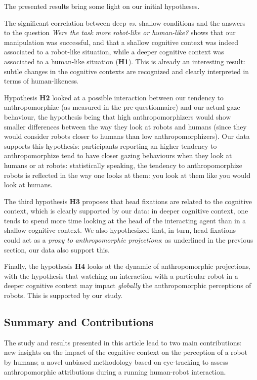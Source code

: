 \documentclass[lettersize, noapacite, twoside, HRI]{apa_HRI}
\newcommand{\vs}{\textit{vs.}\xspace}
\newcommand{\h}[1]{\textbf{H#1}\xspace}
\begin{document}
The presented results bring some light on our initial hypotheses.

The significant correlation between deep \vs shallow conditions and the
answers to the question \emph{Were the task more robot-like or human-like?}
shows that our manipulation was successful, and that a shallow cognitive
context was indeed associated to a robot-like situation, while a deeper
cognitive context was associated to a human-like situation (\h{1}). This is
already an interesting result: subtle changes in the cognitive contexts are
recognized and clearly interpreted in terms of human-likeness.

Hypothesis \h{2} looked at a possible interaction between our tendency to
anthropomorphize (as measured in the pre-questionnaire) and our actual gaze
behaviour, the hypothesis being that high anthropomorphizers would show smaller
differences between the way they look at robots and humans (since they would
consider robots closer to humans than low anthropomorphizers). Our data supports
this hypothesis: participants reporting an higher tendency to anthropomorphize
tend to have closer gazing behaviours when they look at humans or at robots:
statistically speaking, the tendency to anthropomorphize robots
is reflected in the way one looks at them: you look at them
like you would look at humans.

The third hypothesis \h{3} proposes that head fixations are related to the
cognitive context, which is clearly supported by our data: in deeper cognitive
context, one tends to spend more time looking at the head of the interacting
agent than in a shallow cognitive context. We also hypothesized that, in turn,
head fixations could act as a \emph{proxy to anthropomorphic projections}: as
underlined in the previous section, our data also support this.

Finally, the hypothesis \h{4} looks at the dynamic of anthropomorphic
projections, with the hypothesis that watching an interaction with a particular
robot in a deeper cognitive context may impact \emph{globally} the
anthropomorphic perceptions of robots. This is supported by our study.

\subsection{Summary and Contributions}

The study and results presented in this article lead to two main contributions:
new insights on the impact of the cognitive context on the perception of a robot
by humans; a novel unbiased methodology based on eye-tracking to assess
anthropomorphic attributions during a running human-robot interaction.
\end{document}
